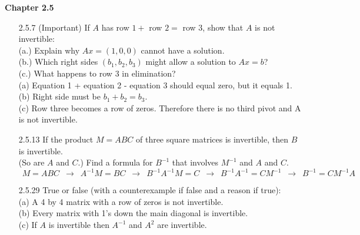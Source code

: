 \documentclass[10pt,twoside,reqno]{article}
\begin{document}
\vspace{5mm}
\textbf{Chapter 2.5}
\begin{enumerate}
\item[2.5.7] (Important) If $A$ has row $1 +$ row $2=$ row $3$, show that $A$ is  not invertible: \\
(a.) Explain why $Ax = (1, 0, 0)$ cannot have a solution. \\
(b.) Which right sides $(b_1, b_2, b_3)$ might allow a solution to $Ax = b$?\\
(c.) What happens to row 3 in elimination?\\
\vspace{3mm}
(a) Equation 1 + equation 2 - equation 3 should equal zero, but it equals 1. \\
(b) Right side must be $b_1+b_2=b_3$. \\
(c) Row three becomes a row of zeros. Therefore there is no third pivot and A is not invertible.
\vspace{3mm}
\item[2.5.13] If the product $M = ABC$ of three square matrices is invertible, then $B$ is invertible. \\
(So are $A$ and $C$.) Find a formula for $B^{-1}$ that involves $M^{-1}$ and $A$ and $C$.\\
\vspace{3mm}
$\hspace{5pt} M=ABC \hspace{6pt} \rightarrow \hspace{6pt} A^{-1}M=BC \hspace{6pt} \rightarrow \hspace{6pt} B^{-1}A^{-1}M=C \hspace{6pt} \rightarrow \hspace{6pt} B^{-1}A^{-1}=CM^{-1} \hspace{6pt} \rightarrow \hspace{6pt} B^{-1}=CM^{-1}A$ \\
\vspace{3mm}
\item[2.5.29] True or false (with a counterexample if false and a reason if true):\\
(a) A 4 by 4 matrix with a row of zeros is not invertible.\\
(b) Every matrix with 1's down the main diagonal is invertible.\\
(c) If $A$ is invertible then $A^{-1}$ and $A^2$ are invertible.\\
\vspace{3mm}

\end{enumerate}
\end{document}
